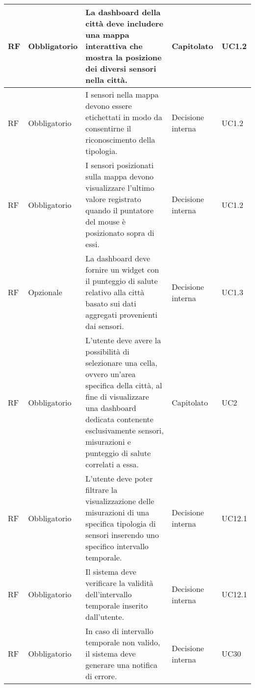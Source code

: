 \begin{longtable}{|C{1.5cm}|C{2cm}|L{5cm}|C{2cm}|C{1.5cm}|}
    \hline
     RF & Obbligatorio & La dashboard della città deve includere una mappa interattiva che mostra la posizione dei diversi sensori nella città. & Capitolato & UC1.2 \\
    
    \hline
     RF & Obbligatorio & I sensori nella mappa devono essere etichettati in modo da consentirne il riconoscimento della tipologia. & Decisione interna & UC1.2 \\
    
    \hline
     RF & Obbligatorio &  I sensori posizionati sulla mappa devono visualizzare l'ultimo valore registrato quando il puntatore del mouse è posizionato sopra di essi. & Decisione interna & UC1.2 \\
    
    \hline
     RF & Opzionale & La dashboard deve fornire un widget con il punteggio di salute relativo alla città basato sui dati aggregati provenienti dai sensori. & Decisione interna & UC1.3 \\
    
    \hline
     RF & Obbligatorio & L'utente deve avere la possibilità di selezionare una cella, ovvero un'area specifica della città, al fine di visualizzare una dashboard dedicata contenente esclusivamente sensori, misurazioni e punteggio di salute correlati a essa. & Capitolato & UC2 \\
    
    \hline
     RF & Obbligatorio & L'utente deve poter filtrare la visualizzazione delle misurazioni di una specifica tipologia di sensori inserendo uno specifico intervallo temporale. & Decisione interna & UC12.1 \\
    
    \hline
     RF & Obbligatorio & Il sistema deve verificare la validità dell'intervallo temporale inserito dall'utente. & Decisione interna & UC12.1 \\
    
    \hline
     RF & Obbligatorio & In caso di intervallo temporale non valido, il sistema deve generare una notifica di errore. & Decisione interna & UC30 \\
    

\end{longtable}
